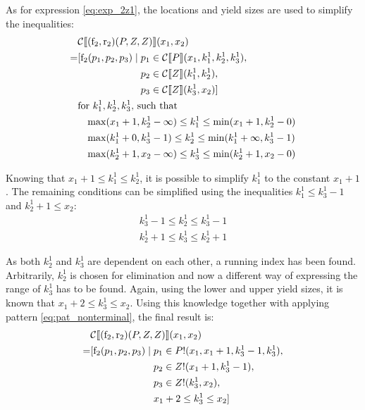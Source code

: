 \documentclass[
    a4paper,
    12pt,
    twoside,
    BCOR=12mm,
    parskip=half,
    chapterprefix,
    numbers=noenddot,
    bibliography=totoc
]{scrbook}
\begin{document}
As for expression \ref{eq:exp_2z1}, the locations and yield sizes are used to simplify the inequalities:
\begin{align*}
    &\mathcal{C} \llbracket (\op{f}_2,\op{r}_2)(P,Z,Z) \rrbracket (x_1,x_2) \\
  = &\!\begin{aligned}[t]
    [ \op{f}_2(p_1,p_2,p_3) \mid \;
    &p_1 \in \mathcal{C}\llbracket P \rrbracket (x_1,k^1_1,k^1_2,k^1_3),\\
    &p_2 \in \mathcal{C}\llbracket Z \rrbracket (k^1_1,k^1_2),\\
    &p_3 \in \mathcal{C}\llbracket Z \rrbracket (k^1_3,x_2)]
    \end{aligned}\\
    &\text{for $k^1_1, k^1_2, k^1_3$, such that}\\
    &\quad\!\max(x_1 + 1, k^1_2 - \infty) \leq k^1_1 \leq \min(x_1 + 1, k^1_2 - 0)\\
    &\quad\!\max(k^1_1 + 0, k^1_3 - 1) \leq k^1_2 \leq \min(k^1_1 + \infty, k^1_3 - 1)\\
    &\quad\!\max(k^1_2 + 1, x_2 - \infty) \leq k^1_3 \leq \min(k^1_2 + 1, x_2 - 0)
\end{align*}

Knowing that $x_1 + 1 \leq k^1_1 \leq k^1_2$, it is possible to simplify $k^1_1$ to the constant $x_1 + 1$. The remaining conditions can be simplified using the inequalities $k^1_1 \leq k^1_3 - 1$ and $k^1_2 + 1 \leq x_2$:	
\begin{align*}
  k^1_3 - 1 \leq k^1_2 \leq k^1_3 - 1\\
  k^1_2 + 1 \leq k^1_3 \leq k^1_2 + 1
\end{align*}

As both $k^1_2$ and $k^1_3$ are dependent on each other, a running index has been found. Arbitrarily, $k^1_2$ is chosen for elimination and now a different way of expressing the range of $k^1_3$ has to be found. Again, using the lower and upper yield sizes, it is known that $x_1 + 2 \leq k^1_3 \leq x_2$. Using this knowledge together with applying pattern \ref{eq:pat_nonterminal}, the final result is:
\begin{align*}
    &\mathcal{C} \llbracket (\op{f}_2,\op{r}_2)(P,Z,Z) \rrbracket (x_1,x_2) \\
  = &\!\begin{aligned}[t]
    [ \op{f}_2(p_1,p_2,p_3) \mid \;
    &p_1 \in P!(x_1,x_1+1,k^1_3-1,k^1_3),\\
    &p_2 \in Z!(x_1+1,k^1_3-1),\\
    &p_3 \in Z!(k^1_3,x_2),\\
    &x_1 + 2 \leq k^1_3 \leq x_2]
    \end{aligned}
\end{align*}
\end{document}
